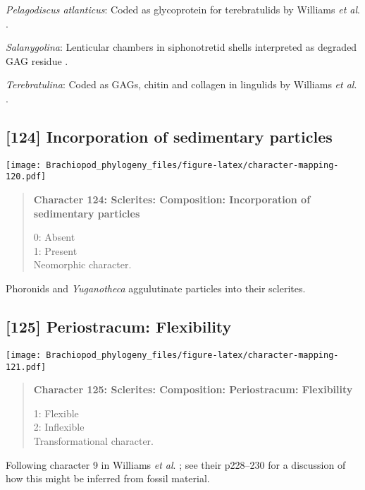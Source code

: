 \documentclass[openany]{book}
\theoremstyle{definition}
\theoremstyle{definition}
\theoremstyle{definition}
\theoremstyle{remark}
\begin{document}
\hypertarget{Pelagodiscus_atlanticus-coding-123}{}
\emph{Pelagodiscus atlanticus}: Coded as glycoprotein for terebratulids
by Williams \emph{et al}. \citeyearpar{Williams1996Asupra}.

\hypertarget{Salanygolina-coding-123}{}
\emph{Salanygolina}: Lenticular chambers in siphonotretid shells
interpreted as degraded GAG residue
\citep{Williams2004Chemicostructure}.

\hypertarget{Terebratulina-coding-123}{}
\emph{Terebratulina}: Coded as GAGs, chitin and collagen in lingulids by
Williams \emph{et al}. \citeyearpar{Williams1996Asupra}.

\subsection*{{[}124{]} Incorporation of sedimentary
particles}\label{incorporation-of-sedimentary-particles}

\texttt{[image: Brachiopod\_phylogeny\_files/figure-latex/character-mapping-120.pdf]}

\begin{quote}
\textbf{Character 124: Sclerites: Composition: Incorporation of
sedimentary particles}

0: Absent\\
1: Present\\
Neomorphic character.
\end{quote}

Phoronids and \emph{Yuganotheca} aggulutinate particles into their
sclerites.

\subsection*{{[}125{]} Periostracum:
Flexibility}\label{periostracum-flexibility}

\texttt{[image: Brachiopod\_phylogeny\_files/figure-latex/character-mapping-121.pdf]}

\begin{quote}
\textbf{Character 125: Sclerites: Composition: Periostracum:
Flexibility}

1: Flexible\\
2: Inflexible\\
Transformational character.
\end{quote}

Following character 9 in Williams \emph{et al}.
\citeyearpar{Williams1998Thediversity}; see their p228--230 for a
discussion of how this might be inferred from fossil material.
\end{document}
